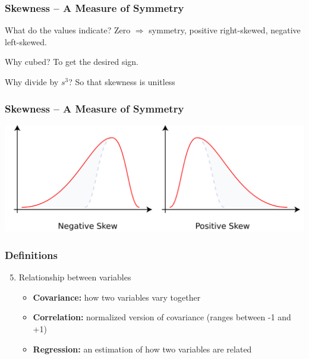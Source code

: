 \documentclass{beamer}
\begin{document}
 \begin{frame}
 \frametitle{Skewness -- A Measure of Symmetry}
	 \begin{center}
	 \end{center}
	 \begin{block}{What do the values indicate?}
	 	Zero $\Rightarrow$ symmetry, positive right-skewed, negative left-skewed.
	 \end{block}
	 \begin{block}{Why cubed?}
	 	To get the desired sign.
	 \end{block}
	 \begin{block}{Why divide by $s^3$?}
	 	So that skewness is unitless
	 \end{block}
 \end{frame}
 
 \begin{frame}
 \frametitle{Skewness -- A Measure of Symmetry}
    \centering
    \includegraphics[scale=0.15]{./images/skew.png}
 \end{frame}

\begin{frame}
\frametitle{Definitions}
	\begin{enumerate}
	\setcounter{enumi}{4}
		\item Relationship between variables
		\begin{itemize}
			\item \textbf{Covariance:} how two variables vary together
			\item \textbf{Correlation:} normalized version of covariance (ranges between -1 and +1)
			\item \textbf{Regression:} an estimation of how two variables are related
		\end{itemize}
	\end{enumerate}
\end{frame}
\end{document}
